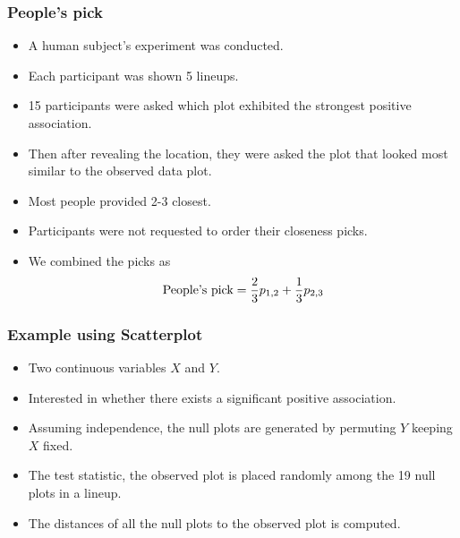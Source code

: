 \documentclass{beamer}
\begin{document}
\begin{frame}
\frametitle{People's pick}
\begin{itemize}
\item A human subject's experiment was conducted.
\item Each participant was shown 5 lineups.
\item 15 participants were asked which plot exhibited the strongest positive association.
\item Then after revealing the location, they were asked the plot that looked most similar to the observed data plot.
\item Most people provided 2-3 closest.
\item Participants were not requested to order their closeness picks. 
\item We combined the picks as 
\[
\hbox{People's pick} = \frac{2}{3} p_{1,2} + \frac{1}{3} p_{2,3}
\]
\end{itemize}
\end{frame}


\begin{frame}
\frametitle{Example using Scatterplot}
\begin{itemize}
\item Two continuous variables $X$ and $Y$.
\item Interested in whether there exists a significant positive association.
\item Assuming independence, the null plots are generated by permuting $Y$ keeping $X$ fixed.
\item The test statistic, the observed plot is placed randomly among the 19 null plots in a lineup.
\item The distances of all the null plots to the observed plot is computed.
\end{itemize}

\end{frame}
\end{document}
